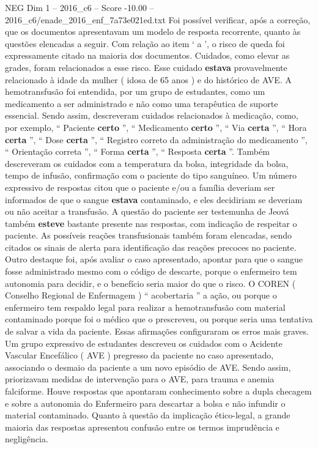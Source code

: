 \begin{textsample}{NEG Dim 1 – 2016\_c6 – Score -10.00 – 2016\_c6/enade\_2016\_enf\_7a73e021ed.txt}
Foi possível verificar, após a correção, que os documentos apresentavam um modelo de resposta recorrente, quanto às questões elencadas a seguir.
Com relação ao item ‘ a ’, o risco de queda foi expressamente citado na maioria dos documentos.
Cuidados, como elevar as grades, foram relacionados a esse risco.
Esse cuidado \textbf{estava} provavelmente relacionado à idade da mulher ( idosa de 65 anos ) e do histórico de AVE.
A hemotransfusão foi entendida, por um grupo de estudantes, como um medicamento a ser administrado e não como uma terapêutica de suporte essencial.
Sendo assim, descreveram cuidados relacionados à medicação, como, por exemplo, “ Paciente \textbf{certo} ”, “ Medicamento \textbf{certo} ”, “ Via \textbf{certa} ”, “ Hora \textbf{certa} ”, “ Dose \textbf{certa} ”, “ Registro correto da administração do medicamento ”, “ Orientação correta ”, “ Forma \textbf{certa} ”, “ Resposta \textbf{certa} ”.
Também descreveram os cuidados com a temperatura da bolsa, integridade da bolsa, tempo de infusão, confirmação com o paciente do tipo sanguíneo.
Um número expressivo de respostas citou que o paciente e/ou a família deveriam ser informados de que o sangue \textbf{estava} contaminado, e eles decidiriam se deveriam ou não aceitar a transfusão.
A questão do paciente ser testemunha de Jeová também \textbf{esteve} bastante presente nas respostas, com indicação de respeitar o paciente.
As possíveis reações transfusionais também foram elencadas, sendo citados os sinais de alerta para identificação das reações precoces no paciente.
Outro destaque foi, após avaliar o caso apresentado, apontar para que o sangue fosse administrado mesmo com o código de descarte, porque o enfermeiro tem autonomia para decidir, e o benefício seria maior do que o risco.
O COREN ( Conselho Regional de Enfermagem ) “ acobertaria ” a ação, ou porque o enfermeiro tem respaldo legal para realizar a hemotransfusão com material contaminado porque foi o médico que o prescreveu, ou porque seria uma tentativa de salvar a vida da paciente.
Essas afirmações configuraram os erros mais graves.
Um grupo expressivo de estudantes descreveu os cuidados com o Acidente Vascular Encefálico ( AVE ) pregresso da paciente no caso apresentado, associando o desmaio da paciente a um novo episódio de AVE.
Sendo assim, priorizavam medidas de intervenção para o AVE, para trauma e anemia falciforme.
Houve respostas que apontaram conhecimento sobre a dupla checagem e sobre a autonomia do Enfermeiro para descartar a bolsa e não infundir o material contaminado.
Quanto à questão da implicação ético-legal, a grande maioria das respostas apresentou confusão entre os termos imprudência e negligência.

\end{textsample}
